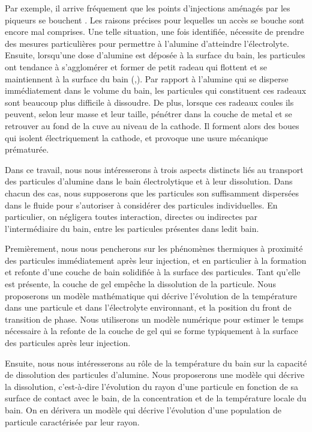 Par exemple, il arrive fréquement que les points d'injections
aménagés par les piqueurs se bouchent \cite{Dion2017}. Les raisons
précises pour lequelles un accès se bouche sont encore mal
comprises. Une telle situation, une fois identifiée, nécessite de
prendre des mesures particulières pour permettre à l'alumine
d'atteindre l'électrolyte. Ensuite, lorsqu'une dose d'alumine est
déposée à la surface du bain, les particules ont tendance à
s'agglomérer et former de petit radeau qui flottent et se maintiennent
à la surface du bain (\cite{Dassylva-Raymond},\cite{Kaszas2017}). Par
rapport à l'alumine qui se disperse immédiatement dans le volume
du bain, les particules qui constituent ces radeaux sont beaucoup plus
difficile à dissoudre. De plus, lorsque ces radeaux coules ils
peuvent, selon leur masse et leur taille, pénétrer dans la couche
de metal et se retrouver au fond de la cuve au niveau de la
cathode. Il forment alors des boues qui isolent électriquement la
cathode, et provoque une usure mécanique prématurée.

Dans ce travail, nous nous intéresserons à trois aspects distincts
liés au transport des particules d'alumine dans le bain électrolytique
et à leur dissolution. Dans chacun des cas, nous supposerons que les
particules son suffisamment dispersées dans le fluide pour
s'autoriser à considérer des particules individuelles. En particulier,
on négligera toutes interaction, directes ou indirectes par
l'intermédiaire du bain, entre les particules présentes dans ledit bain.

Premièrement, nous nous pencherons sur les phénomènes thermiques à
proximité des particules immédiatement après leur injection, et en
particulier à la formation et refonte d'une couche de bain solidifiée
à la surface des particules. Tant qu'elle est présente, la couche de
gel empêche la dissolution de la particule. Nous proposerons un modèle
mathématique qui décrive l'évolution de la température dans une
particule et dans l'électrolyte environnant, et la position du front
de transition de phase. Nous utiliserons un modèle numérique pour
estimer le temps nécessaire à la refonte de la couche de gel qui se
forme typiquement à la surface des particules après leur injection.

Ensuite, nous nous intéresserons au rôle de la température du bain sur
la capacité de dissolution des particules d'alumine. Nous proposerons
une modèle qui décrive la dissolution, c'est-à-dire l'évolution du
rayon d'une particule en fonction de sa surface de contact avec le
bain, de la concentration et de la température locale du bain. On en
dérivera un modèle qui décrive l'évolution d'une population de
particule caractérisée par leur rayon.

